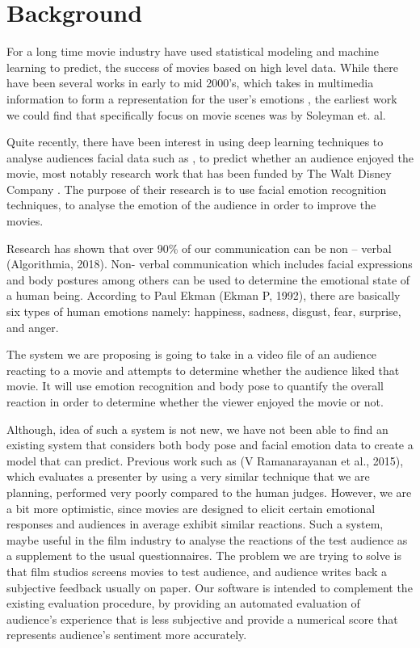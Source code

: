 \documentclass[12pt,a4paper,man]{report}
\begin{document}
\chapter{Background}
\label{sec:org0faedb2}
For a long time movie industry have used statistical modeling and machine learning to predict, the success of movies based on high level data. While there have been several works in early to mid 2000’s, which takes in multimedia information to form a representation for the user’s emotions \cite{Shiliang_Zhang_2008,wu2008interactive}, the earliest work we could find that specifically focus on movie scenes was by Soleyman et. al.

Quite recently, there have been interest in using deep learning techniques to analyse audiences facial data such as \cite{saha2018unsupervised}, to predict whether an audience enjoyed the movie, most notably research work that has been funded by The Walt Disney Company \cite{Deng_2017}. The purpose of their research is to use facial emotion recognition techniques, to analyse the emotion of the audience in order to improve the movies.

Research has shown that over 90\% of our communication can be non – verbal (Algorithmia, 2018). Non- verbal communication which includes facial expressions and body postures among others can be used to determine the emotional state of a human being. According to Paul Ekman (Ekman P, 1992), there are basically six types of human emotions namely:  happiness, sadness, disgust, fear, surprise, and anger. 

The system we are proposing is going to take in a video file of an audience reacting to a movie and attempts to determine whether the audience liked that movie. It will use emotion recognition and body pose to quantify the overall reaction in order to determine whether the viewer enjoyed the movie or not. 

Although, idea of such a system is not new, we have not been able to find an existing system that considers both body pose and facial emotion data to create a model that can predict. Previous work such as (V Ramanarayanan et al., 2015), which evaluates a presenter by using a very similar technique that we are planning, performed very poorly compared to the human judges. However, we are a bit more optimistic, since movies are designed to elicit certain emotional responses and audiences in average exhibit similar reactions. Such a system, maybe useful in the film industry to analyse the reactions of the test audience as a supplement to the usual questionnaires. 
The problem we are trying to solve is that film studios screens movies to test audience, and audience writes back a subjective feedback usually on paper. Our software is intended to complement the existing evaluation procedure, by providing an automated evaluation of audience's experience that is less subjective and provide a numerical score that represents audience's sentiment more accurately.
\end{document}

